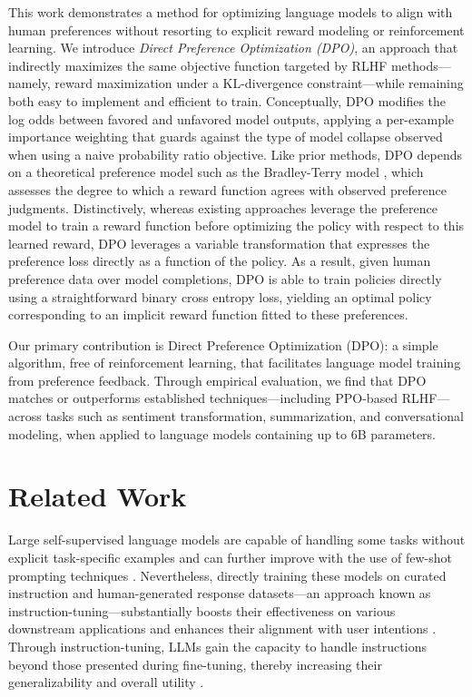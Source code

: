 This work demonstrates a method for optimizing language models to align with human preferences without resorting to explicit reward modeling or reinforcement learning. We introduce \textit{{Direct Preference Optimization} (DPO)}, an approach that indirectly maximizes the same objective function targeted by RLHF methods—namely, reward maximization under a KL-divergence constraint—while remaining both easy to implement and efficient to train. Conceptually, DPO modifies the log odds between favored and unfavored model outputs, applying a per-example importance weighting that guards against the type of model collapse observed when using a naive probability ratio objective. Like prior methods, DPO depends on a theoretical preference model such as the Bradley-Terry model \cite{bradley1952rankanalysis}, which assesses the degree to which a reward function agrees with observed preference judgments. Distinctively, whereas existing approaches leverage the preference model to train a reward function before optimizing the policy with respect to this learned reward, DPO leverages a variable transformation that expresses the preference loss directly as a function of the policy. As a result, given human preference data over model completions, DPO is able to train policies directly using a straightforward binary cross entropy loss, yielding an optimal policy corresponding to an implicit reward function fitted to these preferences.

Our primary contribution is Direct Preference Optimization (DPO): a simple algorithm, free of reinforcement learning, that facilitates language model training from preference feedback. Through empirical evaluation, we find that DPO matches or outperforms established techniques—including PPO-based RLHF—across tasks such as sentiment transformation, summarization, and conversational modeling, when applied to language models containing up to 6B parameters.

\section{Related Work}

Large self-supervised language models are capable of handling some tasks without explicit task-specific examples \citep{radford2019language} and can further improve with the use of few-shot prompting techniques \citep{gpt3,megatron,chowdhery2022palm}. Nevertheless, directly training these models on curated instruction and human-generated response datasets—an approach known as instruction-tuning—substantially boosts their effectiveness on various downstream applications and enhances their alignment with user intentions \citep{mishra-etal-2022-cross,sanh2022multitask,chung2022scaling,thoppilan2022lamda}. Through instruction-tuning, LLMs gain the capacity to handle instructions beyond those presented during fine-tuning, thereby increasing their generalizability and overall utility \citep{chung2022scaling}. 

